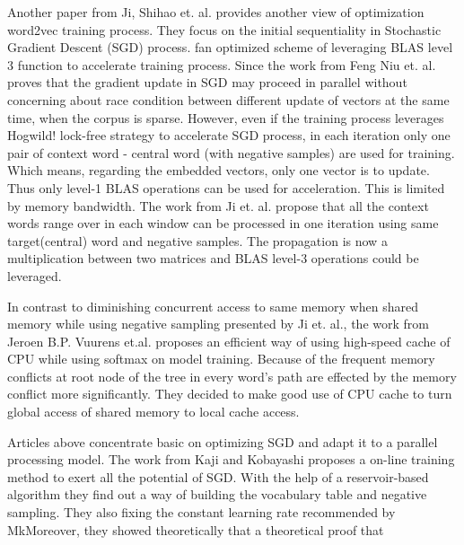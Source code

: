 Another paper from Ji, Shihao et. al. \cite{ji2016parallelizing} provides another view of optimization word2vec training process. They focus on the initial sequentiality in Stochastic Gradient Descent (SGD) process. fan optimized scheme of leveraging BLAS level 3 function to accelerate training process. Since the work from Feng Niu et. al. \cite{recht2011hogwild} proves that the gradient update in SGD may proceed in parallel without concerning about race condition between different update of vectors at the same time, when the corpus is sparse. However, even if the training process leverages Hogwild! \cite{recht2011hogwild} lock-free strategy to accelerate SGD process, in each iteration only one pair of context word - central word (with negative samples) are used for training. Which means, regarding the embedded vectors, only one vector is to update. Thus only level-1 BLAS operations can be used for acceleration. This is limited by memory bandwidth. The work from Ji et. al. propose that all the context words range over in each window can be processed in one iteration using same target(central) word and negative samples. The propagation is now a multiplication between two matrices and BLAS level-3 operations could be leveraged.

In contrast to diminishing concurrent access to same memory when shared memory while using negative sampling presented by Ji et. al., the work from Jeroen B.P. Vuurens et.al. \cite{eickhoff2016efficient} proposes an efficient way of using high-speed cache of CPU while using softmax on model training. Because of the frequent memory conflicts at root node of the tree in every word's path are effected by the memory conflict more significantly. They decided to make good use of CPU cache to turn global access of shared memory to local cache access.

Articles above concentrate basic on optimizing SGD and adapt it to a parallel processing model. The work from Kaji and Kobayashi \cite{kaji2017incremental} proposes a on-line training method to exert all the potential of SGD. With the help of a reservoir-based algorithm they find out a way of building the vocabulary table and negative sampling. They also fixing the constant learning rate recommended by MkMoreover, they showed theoretically that  a theoretical proof that 